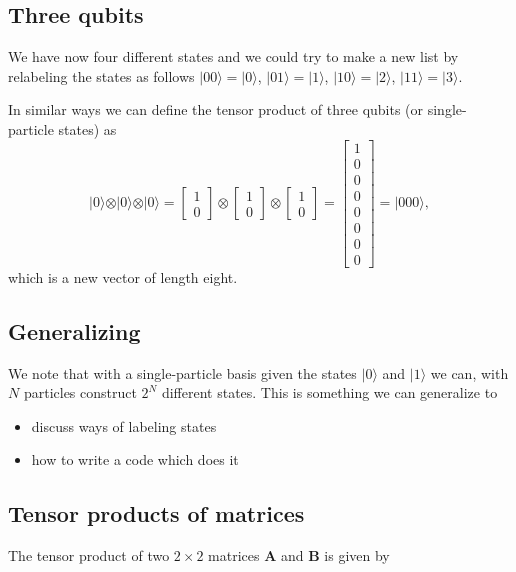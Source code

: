 \subsection{Three qubits}
We have now four different states and we could try to make a new list
by relabeling the states as follows $\vert 00 \rangle =\vert 0
\rangle$, $\vert 01 \rangle =\vert 1 \rangle$, $\vert 10 \rangle
=\vert 2 \rangle$, $\vert 11 \rangle =\vert 3 \rangle$.

In similar ways we can define the tensor product of three qubits (or single-particle states) as
\[
\vert 0 \rangle \otimes \vert 0 \rangle \otimes \vert 0 \rangle = \begin{bmatrix} 1 \\ 0\end{bmatrix} \otimes \begin{bmatrix} 1 \\ 0\end{bmatrix} \otimes \begin{bmatrix} 1 \\ 0\end{bmatrix}=\begin{bmatrix} 1 \\ 0 \\ 0 \\ 0 \\ 0 \\0 \\ 0 \\ 0\end{bmatrix}=\vert 000 \rangle, 
\]
which is a new vector of length eight.

\subsection{Generalizing}

We note that with a single-particle basis given the states $\vert
0\rangle$ and $\vert 1\rangle$ we can, with $N$ particles construct
$2^N$ different states.  This is something we can generalize to
\begin{itemize}
\item discuss ways of labeling states

\item how to write a code which does it
\end{itemize}

\noindent
\subsection{Tensor products of matrices}
The tensor product of two $2\times 2$ matrices $\bm{A}$ and $\bm{B}$ is given by

